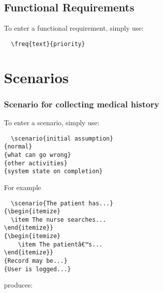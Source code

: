 \documentclass[a4paper, 10pt]{scrreprt}
\newcommand{\scenario}[5]{
\begin{description}
\item [\uppercase{Initial assumption}:]\textit{#1}
  \item [\uppercase{Normal}:] \textit{#2}
  \item [\uppercase{What can go wrong}:] \textit{#3}
  \item [\uppercase{Other Activities}:] \textit{#4}
  \item [\uppercase{System State on Completion}:] \textit{#5}
\end{description}
}
\newcounter{FReqCounter}
\newcommand{\freq}[2]{%
  \vspace{0.5em}%
  \stepcounter{FReqCounter}\noindent%
  \textbf{F-REQ \arabic{FReqCounter}:} #1 \textit{Priority: #2}
}
\begin{document}
\chapter{Functional Requirements}

To enter a functional requirement, simply use:
\begin{verbatim}
  \freq{text}{priority}
\end{verbatim}


\part{Scenarios}

\section{Scenario for collecting medical history}

To enter a scenario, simply use:

\begin{verbatim}
  \scenario{initial assumption}
{normal}
{what can go wrong}
{other activities}
{system state on completion}
\end{verbatim}

For example

\begin{verbatim}
  \scenario{The patient has...}
{\begin{itemize} 
  \item The nurse searches...
\end{itemize}}
{\begin{itemize}
    \item The patientâ€™s...
\end{itemize}}
{Record may be...}
{User is logged...}  
\end{verbatim}

produces:
\end{document}
